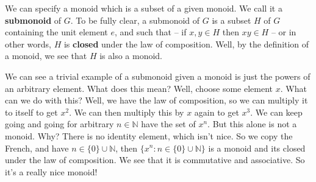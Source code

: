We can specify a monoid which is a subset of a given monoid.
We call it a \textbf{submonoid}
of $G$. To be fully clear, a submonoid of $G$ is a subset
$H$ of $G$ containing the unit element $e$, and such that --
if $x,y\in H$ then $xy\in H$ -- or in other words, $H$ is
\textbf{closed} under the law of composition. Well, by the
definition of a monoid, we see that $H$ is also a monoid.

We can see a trivial example of a submonoid given a monoid
is just the powers of an arbitrary element. What does this
mean? Well, choose some element $x$. What can we do with
this? Well, we have the law of composition, so we can
multiply it to itself to get $x^2$. We can then multiply
this by $x$ again to get $x^3$. We can keep going and going
for arbitrary $n\in\mathbb{N}$ have the set of $x^n$. But
this alone is not a monoid. Why? There is no identity
element, which isn't nice. So we copy the French, and have
$n\in\{0\}\cup\mathbb{N}$, then $\{x^n:
n\in\{0\}\cup\mathbb{N}\}$ is a monoid and its closed under
the law of composition. We see that it is commutative and
associative. So it's a really nice monoid! 
